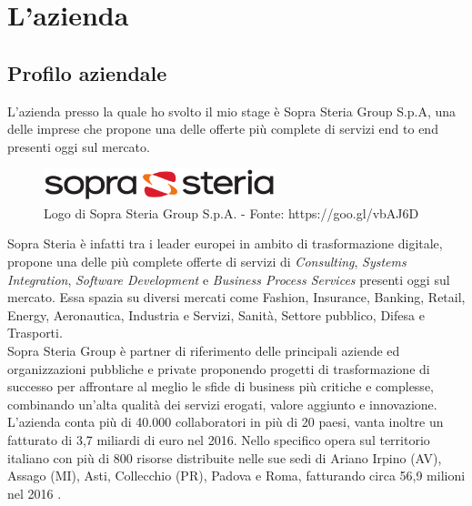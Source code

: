

\chapter{L'azienda}

\section{Profilo aziendale}
L'azienda presso la quale ho svolto il mio stage è Sopra Steria Group S.p.A, una delle imprese che propone una delle offerte più complete di servizi end to end presenti oggi sul mercato.\\

\begin{figure}[H]
	\centering
   	\includegraphics[width=0.6\textwidth]{immagini/logo_azienda}
   	\caption{Logo di Sopra Steria Group S.p.A. - Fonte: https://goo.gl/vbAJ6D}
\end{figure}

Sopra Steria è infatti tra i leader europei in ambito di trasformazione digitale, propone una delle più complete offerte di servizi di \textit{Consulting}, \textit{Systems Integration}, \textit{Software Development} e \textit{Business Process Services} presenti oggi sul mercato.
Essa spazia su diversi mercati come Fashion, Insurance, Banking, Retail, Energy, Aeronautica, Industria e Servizi, Sanità, Settore pubblico, Difesa e Trasporti.\\

Sopra Steria Group è partner di riferimento delle principali aziende ed organizzazioni pubbliche e private proponendo progetti di trasformazione di successo per affrontare al meglio le sfide di business più critiche e complesse, combinando un'alta qualità dei servizi erogati, valore aggiunto e innovazione.\\

L'azienda conta più di 40.000 collaboratori in più di 20 paesi, vanta inoltre un fatturato di 3,7 miliardi di euro nel 2016. Nello specifico opera sul territorio italiano con più di 800 risorse distribuite nelle sue sedi di Ariano Irpino (AV), Assago (MI), Asti, Collecchio (PR), Padova e Roma, fatturando circa 56,9 milioni nel 2016 .\\

